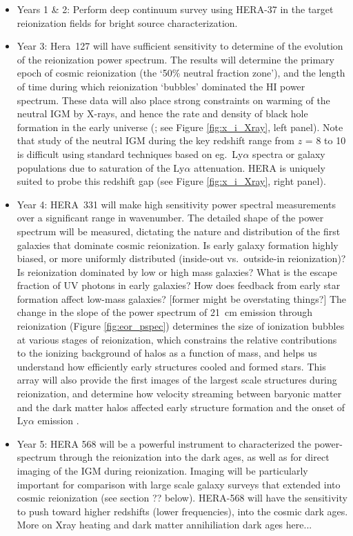 \documentclass[preprint]{aastex}
\begin{document}
\begin{itemize}

\item Years 1 \& 2: Perform deep continuum survey using HERA-37 in the target reionization fields for bright source characterization. 

\item Year 3: Hera~127 will have sufficient sensitivity to determine of the evolution of the reionization power spectrum. The results will determine the primary epoch of cosmic reionization (the `50\% neutral fraction zone'), and the length of time during which reionization `bubbles' dominated the HI power spectrum. These data will also place strong constraints on warming of the neutral IGM by X-rays, and hence the rate and density of black hole formation in the
early universe (\citealt{pritchard_loeb2010}; see Figure \ref{fig:x_i_Xray}, left panel). Note that study of the neutral IGM during the key redshift range from $z$ = 8 to 10 is difficult using standard techniques based on eg.\ Ly$\alpha$ spectra or galaxy populations due to saturation of the Ly$\alpha$ attenuation. HERA is uniquely suited to probe this redshift gap (see Figure \ref{fig:x_i_Xray}, right panel). 

\item Year 4: HERA~331 will make high sensitivity power spectral measurements over a significant range in wavenumber. The detailed shape of the power spectrum will be measured, dictating the nature and distribution of the first galaxies that dominate cosmic  reionization. Is early galaxy formation highly biased, or more uniformly distributed (inside-out vs.\ outside-in reionization)? Is reionization dominated by low or high mass galaxies? What is the escape fraction of UV photons in early galaxies? How does feedback from early star formation affect low-mass galaxies? [former might be overstating things?] The change in the slope of the power spectrum of 21~cm emission through reionization (Figure \ref{fig:eor_pspec}) determines the size of ionization bubbles at various stages of reionization, which constrains the relative contributions to the ionizing background of halos as a function of mass, and helps us understand how efficiently early structures cooled and formed stars. This array will also provide the first images of the largest scale structures during reionization, and determine how velocity streaming between baryonic  matter and the dark matter halos affected early structure formation and the onset of Ly$\alpha$ emission \citep{visbal_et_al2012}.

\item Year 5: HERA 568 will be a powerful instrument to characterized the power-spectrum through the reionization into the dark ages, as well as for direct imaging of the IGM during reionization. Imaging will be particularly important for comparison with large scale galaxy surveys that extended into cosmic reionization (see section ?? below). HERA-568 will have the sensitivity to push toward higher redshifts (lower frequencies), into the cosmic dark ages. More on Xray heating and dark matter annihiliation dark ages here...

\end{itemize}
\end{document}
